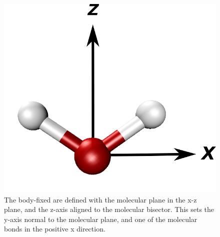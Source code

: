 \begin{figure}[h!]
	\begin{center}
		\includegraphics[scale=1.0]{images/molecularframesmall.png}
		\caption{The body-fixed are defined with the molecular plane in the x-z plane, and the z-axis aligned to the molecular bisector. This sets the y-axis normal to the molecular plane, and one of the molecular bonds in the positive x direction.}
		\label{fig:molecular-frame}
	\end{center}
\end{figure}

